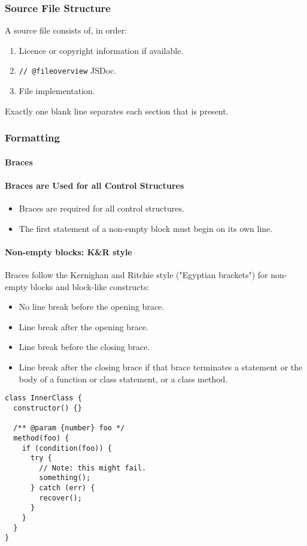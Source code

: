 \documentclass[a4paper, 11pt]{article}
\begin{document}
\subsubsection{Source File Structure}
A source file consists of, in order:
\begin{enumerate}
\item Licence or copyright information if available.
\item \texttt{// @fileoverview} JSDoc.
\item File implementation.
\end{enumerate}
Exactly one blank line separates each section that is present.

\subsubsection{Formatting}

\paragraph{Braces}

\paragraph{Braces are Used for all Control Structures}
\begin{itemize}
\item Braces are required for all control structures.
\item The first statement of a non-empty block must begin on its own line.
\end{itemize}

\paragraph{Non-empty blocks: K\&R style\\}
Braces follow the Kernighan and Ritchie style ("Egyptian brackets") for non-empty blocks and block-like constructs:
\begin{itemize}
\item No line break before the opening brace.
\item Line break after the opening brace.
\item Line break before the closing brace.
\item Line break after the closing brace if that brace terminates a statement or the body of a function or class statement, or a class method. 
\end{itemize}
\begin{verbatim}
class InnerClass {
  constructor() {}

  /** @param {number} foo */
  method(foo) {
    if (condition(foo)) {
      try {
        // Note: this might fail.
        something();
      } catch (err) {
        recover();
      }
    }
  }
}
\end{verbatim}
\end{document}
